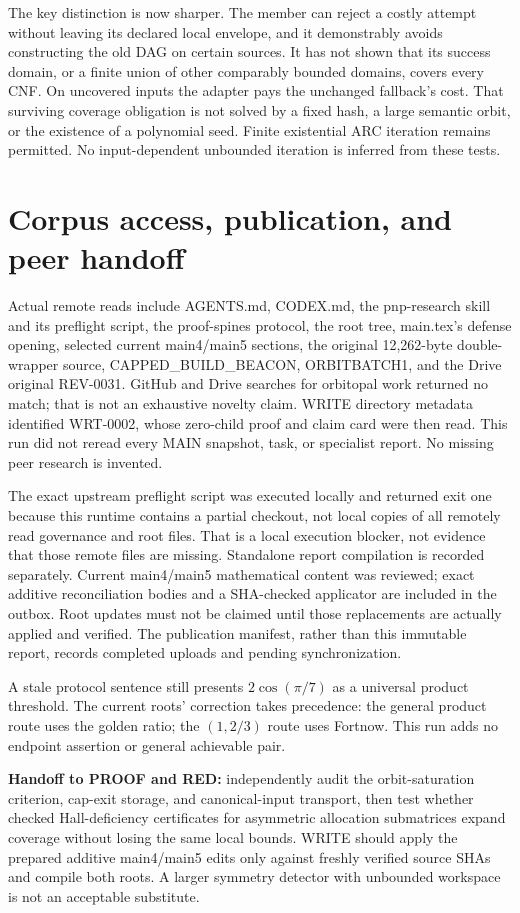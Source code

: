 \documentclass[11pt]{article}
\begin{document}
The key distinction is now sharper. The member can reject a costly attempt
without leaving its declared local envelope, and it demonstrably avoids
constructing the old DAG on certain sources. It has not shown that its
success domain, or a finite union of other comparably bounded domains,
covers every CNF. On uncovered inputs the adapter pays the unchanged
fallback's cost. That surviving coverage obligation is not solved by a
fixed hash, a large semantic orbit, or the existence of a polynomial seed.
Finite existential ARC iteration remains permitted. No input-dependent
unbounded iteration is inferred from these tests.

\section{Corpus access, publication, and peer handoff}
Actual remote reads include AGENTS.md, CODEX.md, the pnp-research skill and
its preflight script, the proof-spines protocol, the root tree, main.tex's
defense opening, selected current main4/main5 sections, the original
12,262-byte double-wrapper source, CAPPED\_BUILD\_BEACON, ORBITBATCH1, and the
Drive original REV-0031. GitHub and Drive searches for orbitopal work returned
no match; that is not an exhaustive novelty claim. WRITE directory metadata
identified WRT-0002, whose zero-child proof and claim card were then read. This run did not reread every MAIN snapshot, task, or
specialist report. No missing peer research is invented.

The exact upstream preflight script was executed locally and returned exit
one because this runtime contains a partial checkout, not local copies of
all remotely read governance and root files. That is a local execution
blocker, not evidence that those remote files are missing. Standalone report
compilation is recorded separately. Current main4/main5 mathematical content
was reviewed; exact additive reconciliation bodies and a SHA-checked
applicator are included in the outbox. Root updates must not be claimed until
those replacements are actually applied and verified. The publication
manifest, rather than this immutable report, records completed uploads and
pending synchronization.

A stale protocol sentence still presents $2\cos(\pi/7)$ as a universal product
threshold. The current roots' correction takes precedence: the general
product route uses the golden ratio; the $(1,2/3)$ route uses Fortnow. This
run adds no endpoint assertion or general achievable pair.

\textbf{Handoff to PROOF and RED:} independently audit the orbit-saturation
criterion, cap-exit storage, and canonical-input transport, then test whether
checked Hall-deficiency certificates for asymmetric allocation submatrices
expand coverage without losing the same local bounds. WRITE should apply the
prepared additive main4/main5 edits only against freshly verified source
SHAs and compile both roots. A larger symmetry detector with unbounded
workspace is not an acceptable substitute.



\end{document}

